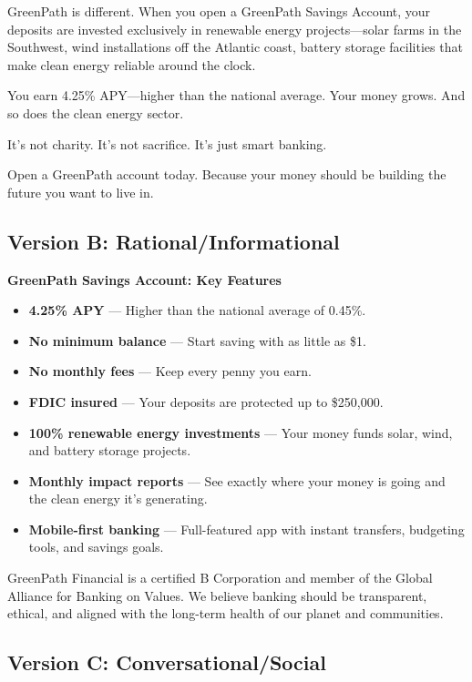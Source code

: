 \documentclass[
    language=english,
    doctype=advertising-copy,
    institution=none,
]{../../omnilatex}
\begin{document}
GreenPath is different. When you open a GreenPath Savings Account, your deposits are invested exclusively in renewable energy projects---solar farms in the Southwest, wind installations off the Atlantic coast, battery storage facilities that make clean energy reliable around the clock.

You earn 4.25\% APY---higher than the national average. Your money grows. And so does the clean energy sector.

It's not charity. It's not sacrifice. It's just smart banking.

Open a GreenPath account today. Because your money should be building the future you want to live in.

\subsection*{Version B: Rational/Informational}

\textbf{GreenPath Savings Account: Key Features}

\begin{itemize}
    \item \textbf{4.25\% APY} --- Higher than the national average of 0.45\%.
    \item \textbf{No minimum balance} --- Start saving with as little as \$1.
    \item \textbf{No monthly fees} --- Keep every penny you earn.
    \item \textbf{FDIC insured} --- Your deposits are protected up to \$250,000.
    \item \textbf{100\% renewable energy investments} --- Your money funds solar, wind, and battery storage projects.
    \item \textbf{Monthly impact reports} --- See exactly where your money is going and the clean energy it's generating.
    \item \textbf{Mobile-first banking} --- Full-featured app with instant transfers, budgeting tools, and savings goals.
\end{itemize}

GreenPath Financial is a certified B Corporation and member of the Global Alliance for Banking on Values. We believe banking should be transparent, ethical, and aligned with the long-term health of our planet and communities.

\subsection*{Version C: Conversational/Social}
\end{document}
